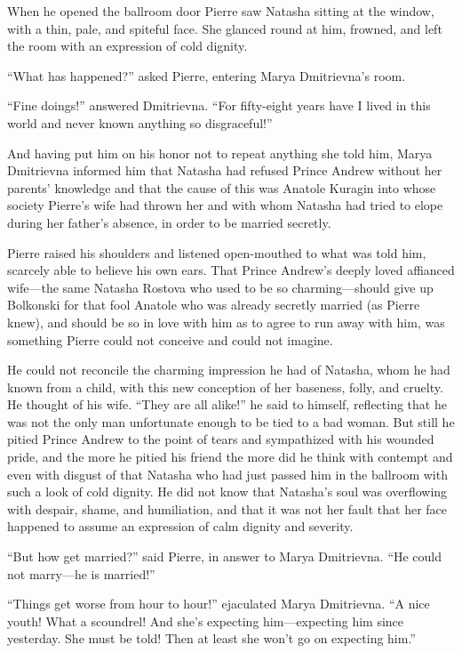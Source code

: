 When he opened the ballroom door Pierre saw Natasha sitting at
the window, with a thin, pale, and spiteful face. She glanced
round at him, frowned, and left the room with an expression of
cold dignity.

``What has happened?'' asked Pierre, entering Marya Dmitrievna's
room.

``Fine doings!'' answered Dmitrievna. ``For fifty-eight years
have I lived in this world and never known anything so
disgraceful!''

And having put him on his honor not to repeat anything she told
him, Marya Dmitrievna informed him that Natasha had refused
Prince Andrew without her parents' knowledge and that the cause
of this was Anatole Kuragin into whose society Pierre's wife had
thrown her and with whom Natasha had tried to elope during her
father's absence, in order to be married secretly.

Pierre raised his shoulders and listened open-mouthed to what was
told him, scarcely able to believe his own ears. That Prince
Andrew's deeply loved affianced wife---the same Natasha Rostova
who used to be so charming---should give up Bolkonski for that
fool Anatole who was already secretly married (as Pierre knew),
and should be so in love with him as to agree to run away with
him, was something Pierre could not conceive and could not
imagine.

He could not reconcile the charming impression he had of Natasha,
whom he had known from a child, with this new conception of her
baseness, folly, and cruelty. He thought of his wife. ``They are
all alike!'' he said to himself, reflecting that he was not the
only man unfortunate enough to be tied to a bad woman. But still
he pitied Prince Andrew to the point of tears and sympathized
with his wounded pride, and the more he pitied his friend the
more did he think with contempt and even with disgust of that
Natasha who had just passed him in the ballroom with such a look
of cold dignity. He did not know that Natasha's soul was
overflowing with despair, shame, and humiliation, and that it was
not her fault that her face happened to assume an expression of
calm dignity and severity.

``But how get married?'' said Pierre, in answer to Marya
Dmitrievna. ``He could not marry---he is married!''

``Things get worse from hour to hour!'' ejaculated Marya
Dmitrievna. ``A nice youth! What a scoundrel! And she's expecting
him---expecting him since yesterday. She must be told! Then at
least she won't go on expecting him.''

